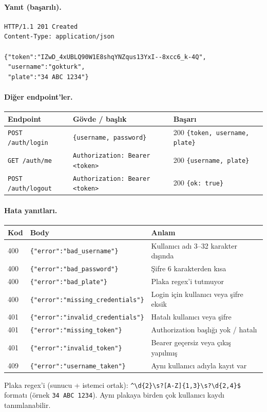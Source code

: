 \paragraph{Yanıt (başarılı).}

\begin{lstlisting}[language=none, basicstyle=\ttfamily\footnotesize]
HTTP/1.1 201 Created
Content-Type: application/json

{"token":"IZwD_4xUBLQ90W1E8shqYNZqus13YxI--8xcc6_k-4Q",
 "username":"gokturk",
 "plate":"34 ABC 1234"}
\end{lstlisting}

\paragraph{Diğer endpoint'ler.}

\begin{tabular}{l l l}
\toprule
\textbf{Endpoint}              & \textbf{Gövde / başlık}                             & \textbf{Başarı}\\
\midrule
\texttt{POST /auth/login}      & \texttt{\{username, password\}}                     & 200 \texttt{\{token, username, plate\}}\\
\texttt{GET\phantom{ } /auth/me}     & \texttt{Authorization: Bearer <token>}              & 200 \texttt{\{username, plate\}}\\
\texttt{POST /auth/logout}     & \texttt{Authorization: Bearer <token>}              & 200 \texttt{\{ok: true\}}\\
\bottomrule
\end{tabular}

\paragraph{Hata yanıtları.}

\begin{tabular}{l l l}
\toprule
\textbf{Kod} & \textbf{Body} & \textbf{Anlam}\\
\midrule
400 & \texttt{\{"error":"bad\_username"\}}        & Kullanıcı adı 3--32 karakter dışında\\
400 & \texttt{\{"error":"bad\_password"\}}        & Şifre 6 karakterden kısa\\
400 & \texttt{\{"error":"bad\_plate"\}}           & Plaka regex'i tutmuyor\\
400 & \texttt{\{"error":"missing\_credentials"\}} & Login için kullanıcı veya şifre eksik\\
401 & \texttt{\{"error":"invalid\_credentials"\}} & Hatalı kullanıcı veya şifre\\
401 & \texttt{\{"error":"missing\_token"\}}       & Authorization başlığı yok / hatalı\\
401 & \texttt{\{"error":"invalid\_token"\}}       & Bearer geçersiz veya çıkış yapılmış\\
409 & \texttt{\{"error":"username\_taken"\}}      & Aynı kullanıcı adıyla kayıt var\\
\bottomrule
\end{tabular}

Plaka regex'i (sunucu + istemci ortak):
\texttt{\textasciicircum\textbackslash d\{2\}\textbackslash s?[A-Z]\{1,3\}\textbackslash s?\textbackslash d\{2,4\}\$}
formatı (örnek \texttt{34 ABC 1234}). Aynı plakaya birden çok kullanıcı
kaydı tanımlanabilir.
